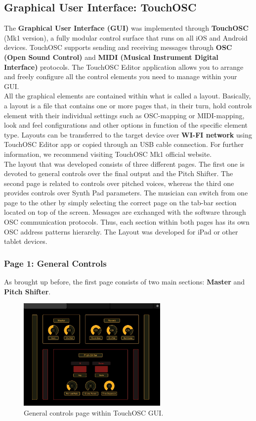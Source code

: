 \documentclass{article}
\begin{document}
\subsection{Graphical User Interface: TouchOSC}

The \textbf{Graphical User Interface (GUI)} was implemented through \textbf{TouchOSC} (Mk1 version), a fully modular control surface that runs on all iOS and Android devices. TouchOSC supports sending and receiving messages through \textbf{OSC (Open Sound Control)} and \textbf{MIDI (Musical Instrument Digital Interface)} protocols. The TouchOSC Editor application allows you to arrange and freely configure all the control elements you need to manage within your GUI. \\
All the graphical elements are contained within what is called a layout. Basically, a layout is a file that contains one or more pages that, in their turn, hold controls element with their individual settings such as OSC-mapping or MIDI-mapping, look and feel configurations and other options in function of the specific element type. Layouts can be transferred to the target device over \textbf{WI-FI network} using TouchOSC Editor app or copied through an USB cable connection. For further information, we recommend visiting TouchOSC Mk1 official website.\\
The layout that was developed consists of three different pages. The first one is devoted to general controls over the final output and the Pitch Shifter. The second page is related to controls over pitched voices, whereas the third one provides controls over Synth Pad parameters. The musician can switch from one page to the other by simply selecting the correct page on the tab-bar section located on top of the screen. Messages are exchanged with the software through OSC communication protocols. Thus, each section within both pages has its own OSC address patterns hierarchy. The Layout was developed for iPad or other tablet devices.


\subsubsection{Page 1: General Controls}

As brought up before, the first page consists of two main sections: \textbf{Master} and \textbf{Pitch Shifter}.

\begin{figure}[H]
\centering
\includegraphics[width=0.65\textwidth]{GeneralControls-TouchOSC-GUI.png}
\caption{General controls page within TouchOSC GUI.}
\label{fig:TouchOSCLayoutPage1}
\end{figure}
\end{document}
